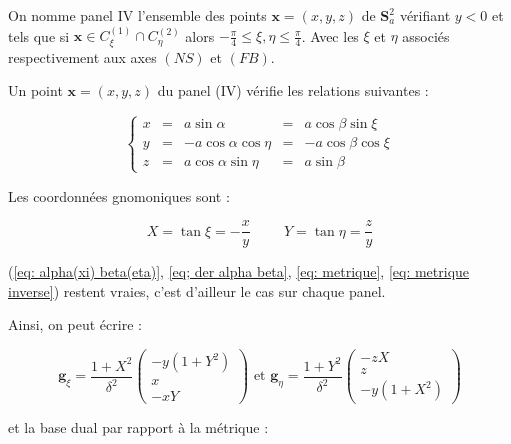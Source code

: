 \begin{definition}
On nomme panel IV l'ensemble des points $\mathbf{x}=(x,y,z)$ de $\mathbf{S}_a^2$ vérifiant $y<0$ et tels que si $\mathbf{x} \in C_{\xi}^{(1)} \cap C_{\eta}^{(2)}$ alors $-\frac{\pi}{4}\leq \xi,\eta \leq \frac{\pi}{4}$. Avec les $\xi$ et $\eta$ associés respectivement aux axes $(NS)$ et $(FB)$.
\end{definition}

Un point $\mathbf{x}=(x,y,z)$ du panel (IV) vérifie les relations suivantes :

\begin{equation}
\left\lbrace
\begin{array}{rcccc}
x & = & a \sin \alpha & = & a \cos \beta \sin \xi \\
y & = & - a \cos \alpha \cos \eta & = & - a \cos \beta \cos \xi \\
z & = & a \cos \alpha \sin \eta & = & a \sin \beta
\end{array}
\right.
\end{equation}

Les coordonnées gnomoniques sont :

\begin{equation}
X = \tan \xi = - \dfrac{x}{y} \hspace{1cm} Y = \tan \eta = \dfrac{z}{y}
\end{equation}

(\ref{eq: alpha(xi) beta(eta)}, \ref{eq; der alpha beta}, \ref{eq: metrique}, \ref{eq: metrique inverse}) restent vraies, c'est d'ailleur le cas sur chaque panel. 

Ainsi, on peut écrire : 

\begin{equation}
\mathbf{g}_{\xi} = \dfrac{1+X^2}{\delta^2} \begin{pmatrix}
-y(1+Y^2) \\ x \\ -xY
\end{pmatrix} \text{ et } \mathbf{g}_{\eta} = \dfrac{1+Y^2}{\delta^2} \begin{pmatrix}
-zX \\ z \\ -y(1+X^2)
\end{pmatrix}
\label{eq: base locale IV}
\end{equation}

et la base dual par rapport à la métrique :


